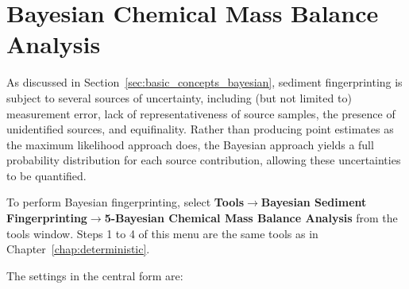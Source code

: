 \documentclass[12pt]{report}
\begin{document}
\section{Bayesian Chemical Mass Balance Analysis}\label{sec:bayesian_cmb}
As discussed in Section~\ref{sec:basic_concepts_bayesian}, sediment fingerprinting is subject to several sources of uncertainty, including (but not limited to) measurement error, lack of representativeness of source samples, the presence of unidentified sources, and equifinality. Rather than producing point estimates as the maximum likelihood approach does, the Bayesian approach yields a full probability distribution for each source contribution, allowing these uncertainties to be quantified.

To perform Bayesian fingerprinting, select \textbf{Tools}$\rightarrow$\textbf{Bayesian Sediment Fingerprinting}$\rightarrow$\textbf{5-Bayesian Chemical Mass Balance Analysis} from the tools window. Steps 1 to 4 of this menu are the same tools as in Chapter~\ref{chap:deterministic}.

The settings in the central form are:
\end{document}
